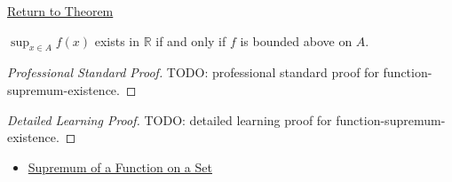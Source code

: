 \newpage
{}
\label{prf:function-supremum-existence}

\begin{remark*}[Return]
\hyperref[thm:function-supremum-existence]{Return to Theorem}
\end{remark*}

\begin{theorem*}
\(\sup_{x\in A} f(x)\) exists in \(\mathbb{R}\) if and only if \(f\) is bounded above on \(A\).
\end{theorem*}

\begin{proof}[Professional Standard Proof]
\LRAProofBodyStart
TODO: professional standard proof for function-supremum-existence.
\end{proof}

\begin{proof}[Detailed Learning Proof]
\LRAProofBodyStart
TODO: detailed learning proof for function-supremum-existence.
\end{proof}

\begin{remark*}
\end{remark*}

\begin{dependencies}
\begin{itemize}
  \item \hyperref[def:function-supremum-on-set]{Supremum of a Function on a Set}
\end{itemize}
\end{dependencies}

\clearpage
